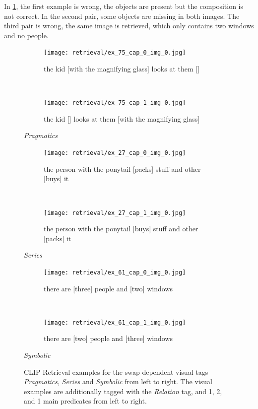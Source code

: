 In \cref{fig:retrieval-examples-visual}, the first example is wrong, the objects are present but the composition is not correct. In the second pair, some objects are missing in both images. The third pair is wrong, the same image is retrieved, which only contains two windows and no people.

\begin{figure}[ht]
\centering
    \begin{minipage}{.30\textwidth}
        \begin{subfigure}{\textwidth}
        \centering
        \texttt{[image: retrieval/ex\_75\_cap\_0\_img\_0.jpg]}
        \caption{the kid [with the magnifying glass] looks at them []}
        \end{subfigure}\\
        \begin{subfigure}{\textwidth}
        \centering
        \texttt{[image: retrieval/ex\_75\_cap\_1\_img\_0.jpg]}
        \caption{the kid [] looks at them [with the magnifying glass]}
        \end{subfigure}%
        \caption*{\textit{Pragmatics}}
    \end{minipage}
    \hfill
    \begin{minipage}{.30\textwidth}
        \begin{subfigure}{\textwidth}
        \centering
        \texttt{[image: retrieval/ex\_27\_cap\_0\_img\_0.jpg]}
        \caption{the person with the ponytail [packs] stuff and other [buys] it}
        \end{subfigure}\\
        \begin{subfigure}{\textwidth}
        \centering
        \texttt{[image: retrieval/ex\_27\_cap\_1\_img\_0.jpg]}
        \caption{the person with the ponytail [buys] stuff and other [packs] it}
        \end{subfigure}%
        \caption*{\textit{Series}}
    \end{minipage}
    \hfill
    \begin{minipage}{.30\textwidth}
        \begin{subfigure}{\textwidth}
        \centering
        \texttt{[image: retrieval/ex\_61\_cap\_0\_img\_0.jpg]}
        \caption{there are [three] people and [two] windows}
        \end{subfigure}\\
        \begin{subfigure}{\textwidth}
        \centering
        \texttt{[image: retrieval/ex\_61\_cap\_1\_img\_0.jpg]}
        \caption{there are [two] people and [three] windows}
        \end{subfigure}%
        \caption*{\textit{Symbolic}}
    \end{minipage}
    \caption{CLIP Retrieval examples for the swap-dependent visual tags \textit{Pragmatics}, \textit{Series} and \textit{Symbolic} from left to right. The visual examples are additionally tagged with the \textit{Relation} tag, and 1, 2, and 1 main predicates from left to right.}
    \label{fig:retrieval-examples-visual}
\end{figure}

